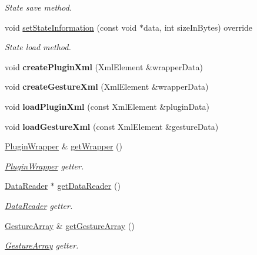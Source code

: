 \begin{DoxyCompactItemize}
\begin{DoxyCompactList}\small\item\em State save method. \end{DoxyCompactList}\item 
void \mbox{\hyperlink{class_plume_processor_aa7ab9da73c37f6db69ea6c7e1e4a0211}{set\+State\+Information}} (const void $\ast$data, int size\+In\+Bytes) override
\begin{DoxyCompactList}\small\item\em State load method. \end{DoxyCompactList}\item 
\mbox{\label{class_plume_processor_ad29b07ddcd526e44529e361374c8c99e}} 
void {\bfseries create\+Plugin\+Xml} (Xml\+Element \&wrapper\+Data)
\item 
\mbox{\label{class_plume_processor_a14455799e2ddefd50b860d4492845509}} 
void {\bfseries create\+Gesture\+Xml} (Xml\+Element \&wrapper\+Data)
\item 
\mbox{\label{class_plume_processor_a08587fb2663557a8250132502785205c}} 
void {\bfseries load\+Plugin\+Xml} (const Xml\+Element \&plugin\+Data)
\item 
\mbox{\label{class_plume_processor_a988e2a3ce47486bd8dfc5d5702420a7e}} 
void {\bfseries load\+Gesture\+Xml} (const Xml\+Element \&gesture\+Data)
\item 
\mbox{\hyperlink{class_plugin_wrapper}{Plugin\+Wrapper}} \& \mbox{\hyperlink{class_plume_processor_a6ec4d89f181beea78034b81911c59aa8}{get\+Wrapper}} ()
\begin{DoxyCompactList}\small\item\em \mbox{\hyperlink{class_plugin_wrapper}{Plugin\+Wrapper}} getter. \end{DoxyCompactList}\item 
\mbox{\hyperlink{class_data_reader}{Data\+Reader}} $\ast$ \mbox{\hyperlink{class_plume_processor_ab24c4b6857ca26d462fce6be9e23cedd}{get\+Data\+Reader}} ()
\begin{DoxyCompactList}\small\item\em \mbox{\hyperlink{class_data_reader}{Data\+Reader}} getter. \end{DoxyCompactList}\item 
\mbox{\hyperlink{class_gesture_array}{Gesture\+Array}} \& \mbox{\hyperlink{class_plume_processor_a691a2f342167e257fabf74d0bb76a563}{get\+Gesture\+Array}} ()
\begin{DoxyCompactList}\small\item\em \mbox{\hyperlink{class_gesture_array}{Gesture\+Array}} getter. \end{DoxyCompactList}\end{DoxyCompactItemize}


